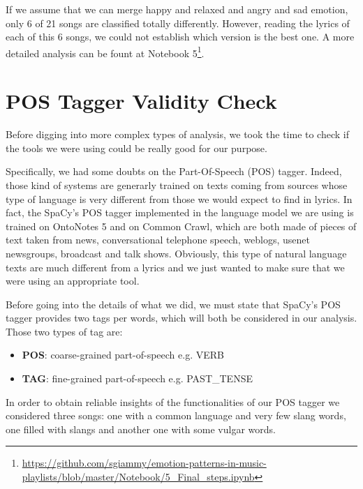 If we assume that we can merge happy and relaxed and angry and sad emotion, only 6 of 21 songs are classified totally differently. However, reading the lyrics of each of this 6 songs, we could not establish which version is the best one. A more detailed analysis can be fount at Notebook 5\footnote{\url{https://github.com/sgiammy/emotion-patterns-in-music-playlists/blob/master/Notebook/5_Final_steps.ipynb}}. 

\section{POS Tagger Validity Check} 

Before digging into more complex types of analysis, we took the time to check if
the tools we were using could be really good for our purpose. \par

Specifically, we had some doubts on the Part-Of-Speech (POS) tagger. Indeed, those kind of systems are generarly 
trained on texts coming from sources whose type of language is very different from those
we would expect to find in lyrics. In fact, the SpaCy's POS tagger implemented in the language
model we are using is trained on OntoNotes 5\cite{ontonotes5} and on Common Crawl\cite{common-crawl},
which are both made of pieces of text taken from news, conversational telephone speech, weblogs, 
usenet newsgroups, broadcast and talk shows. Obviously, this type of natural language texts are 
much different from a lyrics and we just wanted to make sure that we were using an appropriate tool.

Before going into the details of what we did, we must state that SpaCy's POS tagger provides two tags per words, which
will both be considered in our analysis. Those two types of tag are:

\begin{itemize}
\item \textbf{POS}: coarse-grained part-of-speech e.g. VERB
\item \textbf{TAG}: fine-grained part-of-speech e.g. PAST\_TENSE
\end{itemize}

In order to obtain reliable insights of the functionalities of our POS tagger we considered three songs:
one with a common language and very few slang words, one filled with slangs and another one with some
vulgar words.

